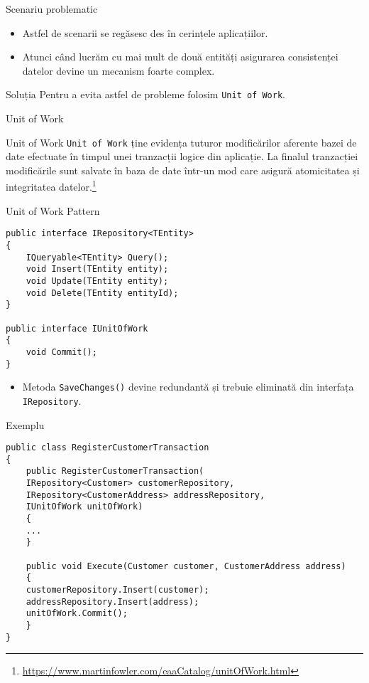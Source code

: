 \documentclass[presentation]{beamer}
\begin{document}
\begin{frame}[label={sec:orgbe52551}]{Scenariu problematic}
\begin{itemize}
\item Astfel de scenarii se regăsesc des în cerințele aplicațiilor.
\item Atunci când lucrăm cu mai mult de două entități asigurarea consistenței datelor devine un mecanism foarte complex.
\end{itemize}
\end{frame}
\begin{frame}[label={sec:org0e737a0},fragile]{Soluția}
 Pentru a evita astfel de probleme folosim \texttt{Unit of Work}.
\end{frame}
\begin{frame}[label={sec:org52a49bf},fragile]{Unit of Work}
 \begin{block}{Unit of Work}
\texttt{Unit of Work} ține evidența tuturor modificărilor aferente bazei de date efectuate în timpul unei tranzacții logice din aplicație. La finalul tranzacției modificările sunt salvate în baza de date într-un mod care asigură atomicitatea și integritatea datelor.\footnote{\url{https://www.martinfowler.com/eaaCatalog/unitOfWork.html}}
\end{block}
\end{frame}
\begin{frame}[label={sec:org62ff8df},fragile]{Unit of Work Pattern}
 \begin{verbatim}
public interface IRepository<TEntity>
{
    IQueryable<TEntity> Query();
    void Insert(TEntity entity);
    void Update(TEntity entity);
    void Delete(TEntity entityId);
}

public interface IUnitOfWork
{
    void Commit();
}
\end{verbatim}
\begin{itemize}
\item Metoda \texttt{SaveChanges()} devine redundantă și trebuie eliminată din interfața \texttt{IRepository}.
\end{itemize}
\end{frame}
\begin{frame}[label={sec:orga10523e},fragile]{Exemplu}
 \begin{verbatim}
public class RegisterCustomerTransaction
{
    public RegisterCustomerTransaction(
	IRepository<Customer> customerRepository,
	IRepository<CustomerAddress> addressRepository,
	IUnitOfWork unitOfWork)
    {
	...
    }

    public void Execute(Customer customer, CustomerAddress address)
    {
	customerRepository.Insert(customer);
	addressRepository.Insert(address);
	unitOfWork.Commit();
    }
}
\end{verbatim}
\end{frame}
\end{document}

